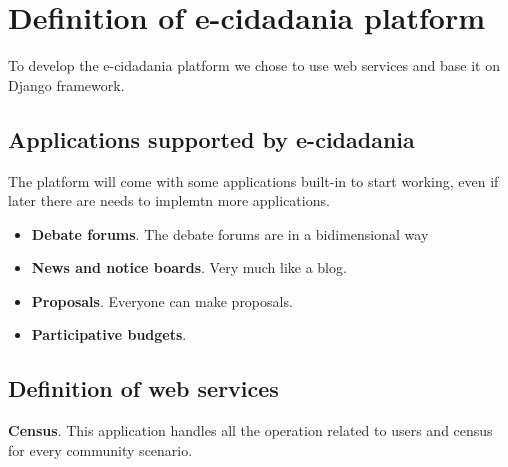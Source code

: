 \documentclass{article}
\begin{document}
\section{Definition of e-cidadania platform}
To develop the e-cidadania platform we chose to use web services and base it on Django framework.

\subsection{Applications supported by e-cidadania}
The platform will come with some applications built-in to start working, even if later there are needs to implemtn more applications.

\begin{itemize}
\item {\bf Debate forums}. The debate forums are in a bidimensional way
\item {\bf News and notice boards}. Very much like a blog.
\item {\bf Proposals}. Everyone can make proposals.
\item {\bf Participative budgets}.
\end{itemize}

\subsection{Definition of web services}

{\bf Census}. This application handles all the operation related to users and census for every community scenario.
\end{document}
